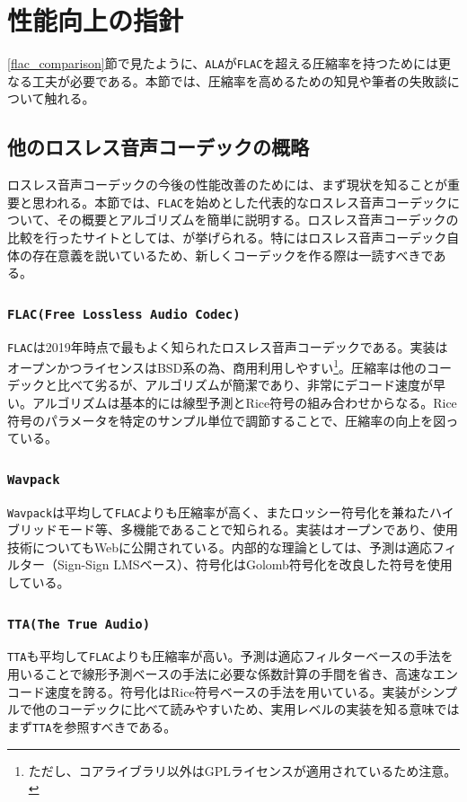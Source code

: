 \documentclass[uplatex,dvipdfmx,b5j,10pt]{jsbook}
\theoremstyle{definition}
\begin{document}
\section{性能向上の指針}

\ref{flac_comparison}節で見たように、\texttt{ALA}が\texttt{FLAC}を超える圧縮率を持つためには更なる工夫が必要である。本節では、圧縮率を高めるための知見や筆者の失敗談について触れる。

\subsection{他のロスレス音声コーデックの概略}

ロスレス音声コーデックの今後の性能改善のためには、まず現状を知ることが重要と思われる。本節では、\texttt{FLAC}を始めとした代表的なロスレス音声コーデックについて、その概要とアルゴリズムを簡単に説明する。ロスレス音声コーデックの比較を行ったサイトとしては、\cite{losslesscomprepo, losslesscompwiki, oldlosslesscomp, losslessaudiosuck, losslesscompjpn}が挙げられる。特に\cite{losslessaudiosuck}はロスレス音声コーデック自体の存在意義を説いているため、新しくコーデックを作る際は一読すべきである。

\subsubsection{\texttt{FLAC(Free Lossless Audio Codec)}}
\texttt{FLAC}\cite{flac}は2019年時点で最もよく知られたロスレス音声コーデックである。実装はオープンかつライセンスはBSD系の為、商用利用しやすい\footnote{ただし、コアライブラリ以外はGPLライセンスが適用されているため注意。}。圧縮率は他のコーデックと比べて劣るが、アルゴリズムが簡潔であり、非常にデコード速度が早い。アルゴリズムは基本的には線型予測とRice符号の組み合わせからなる。Rice符号のパラメータを特定のサンプル単位で調節することで、圧縮率の向上を図っている。

\subsubsection{\texttt{Wavpack}}
\texttt{Wavpack}\cite{wavpack}は平均して\texttt{FLAC}よりも圧縮率が高く、またロッシー符号化を兼ねたハイブリッドモード等、多機能であることで知られる。実装はオープンであり、使用技術についてもWebに公開されている\cite{wavpacktheory}。内部的な理論としては、予測は適応フィルター（Sign-Sign LMSベース）、符号化はGolomb符号化を改良した符号を使用している。

\subsubsection{\texttt{TTA(The True Audio)}}
\texttt{TTA}\cite{wavpack}も平均して\texttt{FLAC}よりも圧縮率が高い。予測は適応フィルターベースの手法を用いることで線形予測ベースの手法に必要な係数計算の手間を省き、高速なエンコード速度を誇る。符号化はRice符号ベースの手法を用いている。実装がシンプルで他のコーデックに比べて読みやすいため、実用レベルの実装を知る意味ではまず\texttt{TTA}を参照すべきである。
\end{document}
